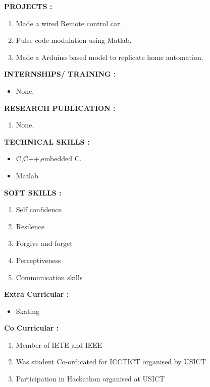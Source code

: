 \documentclass{article}
\begin{document}
	\textbf{PROJECTS :}
	\begin{enumerate}
		\item Made a wired Remote control car.
		\item Pulse code modulation using Matlab.
		\item Made a Arduino based model to replicate home automation.
	\end{enumerate}

	\textbf{INTERNSHIPS/ TRAINING :}
	\begin{itemize}
		\item None.
	\end{itemize}
	
		\textbf{RESEARCH PUBLICATION :}
		\begin{enumerate}
			\item None.
		\end{enumerate}
		
		\newpage
		
			\textbf{TECHNICAL SKILLS :}
			\begin{itemize}	
				\item C,C++,embedded C.
				\item Matlab 
				\end{itemize}
	
	
	\textbf{SOFT SKILLS :}
	\begin{enumerate}
	\item Self confidence 
	\item Resilence
	\item Forgive and forget
	\item Perceptiveness
	\item Communication skills 

	\end{enumerate}
	
	\textbf{Extra Curricular :}
	\begin{itemize}
		\item Skating
		
	\end{itemize}
	
	\textbf{Co Curricular :}
	\begin{enumerate}
		\item Member of IETE and IEEE
		\item Was student Co-ordicated for ICCTICT organised by USICT
		\item Participation in Hackathon organised at USICT
		
		\end{enumerate}
		
\end{document}
